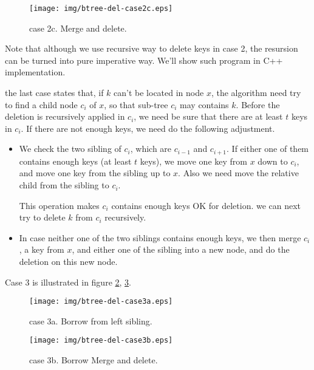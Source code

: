 \documentclass{article}
\begin{document}
\begin{figure}[htbp]
  \begin{center}
    \texttt{[image: img/btree-del-case2c.eps]}
    \caption{case 2c. Merge and delete.} \label{fig:btree-del-case2c}
  \end{center}
\end{figure}

Note that although we use recursive way to delete keys in case 2, the 
resursion can be turned into pure imperative way. We'll show such
program in C++ implementation.

the last case states that, if $k$ can't be located in node $x$, the algorithm
need try to find a child node $c_i$ of $x$, so that sub-tree $c_i$ may 
contains $k$. Before the deletion is recursively applied in $c_i$, we
need be sure that there are at least $t$ keys in $c_i$. If there are
not enough keys, we need do the following adjustment.

\begin{itemize}
\item We check the two sibling of $c_i$, which are $c_{i-1}$ and $c_{i+1}$.
If either one of them contains enough keys (at least $t$ keys), we move
one key from $x$ down to $c_i$, and move one key from the sibling up to
$x$. Also we need move the relative child from the sibling to $c_i$.

This operation makes $c_i$ contains enough keys OK for deletion. we can
next try to delete $k$ from $c_i$ recursively.

\item In case neither one of the two siblings contains enough keys, we then 
merge $c_i$, a key from $x$, and either one of the sibling into a new
node, and do the deletion on this new node.
\end{itemize}

Case 3 is illustrated in figure \ref{fig:btree-del-case3a}, \ref{fig:btree-del-case3b}.

\begin{figure}[htbp]
  \begin{center}
    \texttt{[image: img/btree-del-case3a.eps]}
    \caption{case 3a. Borrow from left sibling.} \label{fig:btree-del-case3a}
  \end{center}
\end{figure}

\begin{figure}[htbp]
  \begin{center}
    \texttt{[image: img/btree-del-case3b.eps]}
    \caption{case 3b. Borrow Merge and delete.} \label{fig:btree-del-case3b}
  \end{center}
\end{figure}
\end{document}
